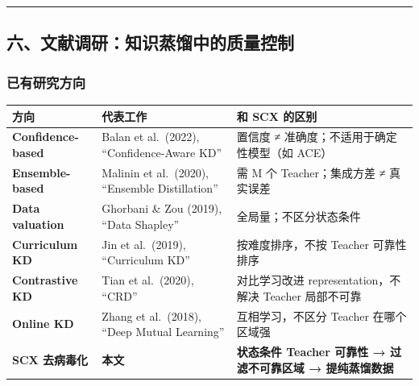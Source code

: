 \documentclass[
  12pt,
]{ctexart}
\begin{document}
\begin{center}\rule{0.5\linewidth}{0.5pt}\end{center}

\subsection{六、文献调研：知识蒸馏中的质量控制}\label{ux516dux6587ux732eux8c03ux7814ux77e5ux8bc6ux84b8ux998fux4e2dux7684ux8d28ux91cfux63a7ux5236}

\subsubsection{已有研究方向}\label{ux5df2ux6709ux7814ux7a76ux65b9ux5411}

\begin{longtable}[]{@{}
  >{\raggedright\arraybackslash}p{}
  >{\raggedright\arraybackslash}p{}
  >{\raggedright\arraybackslash}p{}@{}}
\toprule\noalign{}
\begin{minipage}[b]{\linewidth}\raggedright
方向
\end{minipage} & \begin{minipage}[b]{\linewidth}\raggedright
代表工作
\end{minipage} & \begin{minipage}[b]{\linewidth}\raggedright
和 SCX 的区别
\end{minipage} \\
\midrule\noalign{}
\endhead
\bottomrule\noalign{}
\endlastfoot
\textbf{Confidence-based} & Balan et al.~(2022), ``Confidence-Aware KD''
& 置信度 ≠ 准确度；不适用于确定性模型（如 ACE） \\
\textbf{Ensemble-based} & Malinin et al.~(2020), ``Ensemble
Distillation'' & 需 M 个 Teacher；集成方差 ≠ 真实误差 \\
\textbf{Data valuation} & Ghorbani \& Zou (2019), ``Data Shapley'' &
全局量；不区分状态条件 \\
\textbf{Curriculum KD} & Jin et al.~(2019), ``Curriculum KD'' &
按难度排序，不按 Teacher 可靠性排序 \\
\textbf{Contrastive KD} & Tian et al.~(2020), ``CRD'' & 对比学习改进
representation，不解决 Teacher 局部不可靠 \\
\textbf{Online KD} & Zhang et al.~(2018), ``Deep Mutual Learning'' &
互相学习，不区分 Teacher 在哪个区域强 \\
\textbf{SCX 去病毒化} & \textbf{本文} & \textbf{状态条件 Teacher 可靠性
→ 过滤不可靠区域 → 提纯蒸馏数据} \\
\end{longtable}
\end{document}
